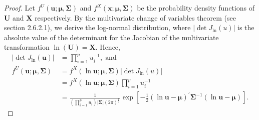 \documentclass[11pt,letterpaper]{article}
\numberwithin{equation}{section}
\numberwithin{equation}{section}
\numberwithin{equation}{section}
\begin{document}
\begin{proof}
Let $f^U(\bm{u}; \bm{\mu},\bm{\Sigma})$ and $f^X(\bm{x}; \bm{\mu},\bm{\Sigma})$ be the probability density functions of $\bm{U}$ and $\bm{X}$ respectively. By the multivariate change of variables theorem (see \cite{murphy2012machine} section 2.6.2.1), we derive the log-normal distribution, where $ | \det J_{\ln} (u) | $ is the absolute value of the determinant for the Jacobian of the multivariate transformation $\ln(\bm{U}) = \bm{X} $. Hence,
\begin{align*}
 | \det J_{\ln} (\bm{u}) | & = \prod_{i=1}^p u_i^{-1}, \; \text{and} \; \\
   f^U(\bm{u}; \bm{\mu},\bm{\Sigma})  & =  f^X(\ln \bm{u}; \bm{\mu},\bm{\Sigma})  | \det J_{\ln} (u) | \\
  & = f^X(\ln \bm{u}; \bm{\mu},\bm{\Sigma})\prod_{i=1}^p u_i^{-1} \\
  & =  \frac{1}{(\prod_{i=1}^{p}u_{i})| \bm{\Sigma} |(2 \pi)^{\frac{p}{2}}}   \exp\left[-\frac{1}{2}(\ln \bm{u} -\bm{\mu})^{'}  \bm{\Sigma}^{-1}(\ln \bm{u} -\bm{\mu})\right].
  \end{align*}
\end{proof}
\end{document}
